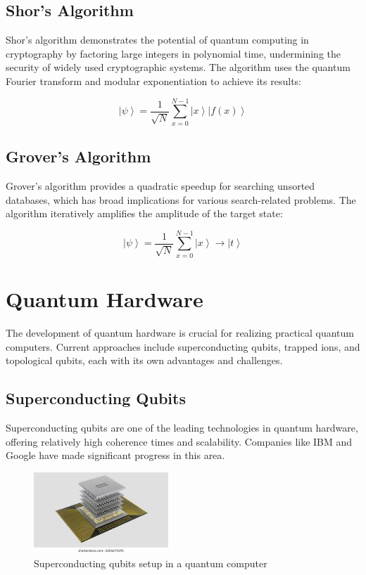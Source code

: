 \documentclass[conference]{IEEEtran}
\begin{document}
\subsection{Shor's Algorithm}
Shor's algorithm demonstrates the potential of quantum computing in cryptography by factoring large integers in polynomial time, undermining the security of widely used cryptographic systems. The algorithm uses the quantum Fourier transform and modular exponentiation to achieve its results:

\begin{equation}
    \left| \psi \right\rangle = \frac{1}{\sqrt{N}} \sum_{x=0}^{N-1} \left| x \right\rangle \left| f(x) \right\rangle
\end{equation}

\subsection{Grover's Algorithm}
Grover's algorithm provides a quadratic speedup for searching unsorted databases, which has broad implications for various search-related problems. The algorithm iteratively amplifies the amplitude of the target state:

\begin{equation}
    \left| \psi \right\rangle = \frac{1}{\sqrt{N}} \sum_{x=0}^{N-1} \left| x \right\rangle \rightarrow \left| t \right\rangle
\end{equation}

\section{Quantum Hardware}
The development of quantum hardware is crucial for realizing practical quantum computers. Current approaches include superconducting qubits, trapped ions, and topological qubits, each with its own advantages and challenges.

\subsection{Superconducting Qubits}
Superconducting qubits are one of the leading technologies in quantum hardware, offering relatively high coherence times and scalability. Companies like IBM and Google have made significant progress in this area.

\begin{figure}[h]
\centering
\includegraphics[width=0.45\textwidth]{image1.jpeg}
\caption{Superconducting qubits setup in a quantum computer}
\label{fig:superconducting}
\end{figure}
\end{document}
